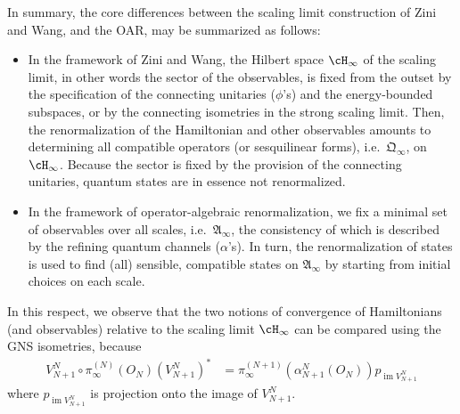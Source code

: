 \documentclass[a4paper, 11pt]{article}
\newcommand{\fA}{\mathfrak{A}}\newcommand{\cA}{\mathcal{A}}\newcommand{\dA}{\mathds{A}}\newcommand{\sA}{\mathscr{A}}
\newcommand{\fQ}{\mathfrak{Q}}
\DeclareMathOperator{\1}{\mathds{1}}
\DeclareMathOperator{\im}{im}
\begin{document}
In summary, the core differences between the scaling limit construction of Zini and Wang, and the OAR, may be summarized as follows: 
\begin{itemize}
	\item In the framework of Zini and Wang, the Hilbert space $\cH_{\infty}$ of the scaling limit, in other words the sector of the observables, is fixed from the outset by the specification of the connecting unitaries ($\phi$'s) and the energy-bounded subspaces, or by the connecting isometries in the strong scaling limit. Then, the renormalization of the Hamiltonian and other observables amounts to determining all compatible operators (or sesquilinear forms), i.e.~$\fQ_{\infty}$, on $\cH_{\infty}$. Because the sector is fixed by the provision of the connecting unitaries, quantum states are in essence not renormalized.
	\item In the framework of operator-algebraic renormalization, we fix a minimal set of observables over all scales, i.e.~$\fA_{\infty}$, the consistency of which is described by the refining quantum channels ($\alpha$'s). In turn, the renormalization of states is used to find (all) sensible, compatible states on $\fA_{\infty}$ by starting from initial choices on each scale.
\end{itemize}
In this respect, we observe that the two notions of convergence of Hamiltonians (and observables) relative to the scaling limit $\cH_{\infty}$ can be compared using the GNS isometries, because
\begin{align*}
V^{N}_{N+1}\circ \pi_{\infty}^{(N)}(O_{N})(V^{N}_{N+1})^{*} & \!=\!\pi_{\infty}^{(N+1)}(\alpha^{N}_{N+1}(O_{N}))p_{\im V^{N}_{N+1}}
\end{align*}
where $p_{\im V^{N}_{N+1}}$ is projection onto the image of $V^{N}_{N+1}$.

\bigskip
\end{document}

